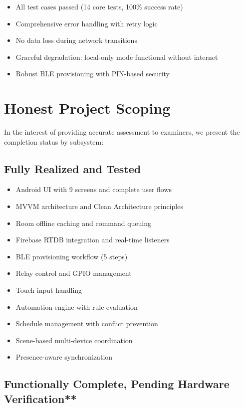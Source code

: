 \begin{itemize}
    \item All test cases passed (14 core tests, 100\% success rate)
    \item Comprehensive error handling with retry logic
    \item No data loss during network transitions
    \item Graceful degradation: local-only mode functional without internet
    \item Robust BLE provisioning with PIN-based security
\end{itemize}

\section{Honest Project Scoping}

In the interest of providing accurate assessment to examiners, we present the completion status by subsystem:

\subsection{Fully Realized and Tested}

\begin{itemize}
    \item Android UI with 9 screens and complete user flows
    \item MVVM architecture and Clean Architecture principles
    \item Room offline caching and command queuing
    \item Firebase RTDB integration and real-time listeners
    \item BLE provisioning workflow (5 steps)
    \item Relay control and GPIO management
    \item Touch input handling
    \item Automation engine with rule evaluation
    \item Schedule management with conflict prevention
    \item Scene-based multi-device coordination
    \item Presence-aware synchronization
\end{itemize}

\subsection{Functionally Complete, Pending Hardware Verification**}

